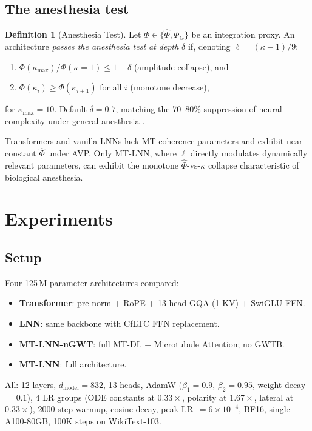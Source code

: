 \documentclass[11pt]{article}
\theoremstyle{definition}
\newtheorem{definition}{Definition}[section]
\newcommand{\phihat}{\hat{\Phi}}
\newcommand{\phig}{\Phi_{\mathrm{G}}}
\begin{document}
\subsection{The anesthesia test}
\begin{definition}[Anesthesia Test]
Let $\Phi\in\{\phihat,\phig\}$ be an integration proxy. An architecture \emph{passes the anesthesia test at depth} $\delta$ if, denoting $\ell=(\kappa-1)/9$:
\begin{enumerate}[label=(\roman*),noitemsep]
  \item $\Phi(\kappa_\text{max}) / \Phi(\kappa=1) \le 1 - \delta$ \quad (amplitude collapse), and
  \item $\Phi(\kappa_i) \ge \Phi(\kappa_{i+1})$ for all $i$ \quad (monotone decrease),
\end{enumerate}
for $\kappa_\text{max}=10$. Default $\delta=0.7$, matching the 70--80\% suppression of neural complexity under general anesthesia \citep{casali2013theoretically}.
\end{definition}

Transformers and vanilla LNNs lack MT coherence parameters and exhibit near-constant $\phihat$ under AVP. Only MT-LNN, where $\ell$ directly modulates dynamically relevant parameters, can exhibit the monotone $\phihat$-vs-$\kappa$ collapse characteristic of biological anesthesia.

\section{Experiments}
\label{sec:experiments}

\subsection{Setup}
Four 125\,M-parameter architectures compared:

\begin{itemize}[noitemsep]
  \item \textbf{Transformer}: pre-norm + RoPE + 13-head GQA (1 KV) + SwiGLU FFN.
  \item \textbf{LNN}: same backbone with CfLTC FFN replacement.
  \item \textbf{MT-LNN-nGWT}: full MT-DL + Microtubule Attention; no GWTB.
  \item \textbf{MT-LNN}: full architecture.
\end{itemize}

All: 12 layers, $d_\text{model}=832$, 13 heads, AdamW ($\beta_1=0.9$, $\beta_2=0.95$, weight decay~$=0.1$), 4 LR groups (ODE constants at $0.33\times$, polarity at $1.67\times$, lateral at $0.33\times$), 2000-step warmup, cosine decay, peak LR~$=6\times10^{-4}$, BF16, single A100-80GB, 100K steps on WikiText-103.
\end{document}
